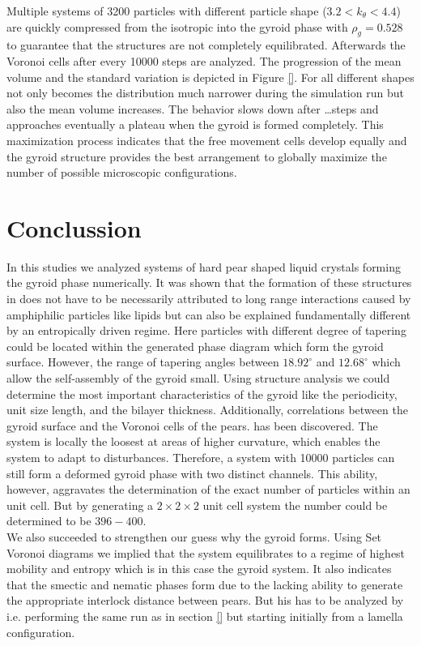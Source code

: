 \documentclass[epj,onecolumn]{webofc}
\begin{document}
Multiple systems of 3200 particles with different particle shape ($3.2<k_{\theta}<4.4$) are quickly compressed from the isotropic into the gyroid phase with $\rho_g=0.528$ to guarantee that the structures are not completely equilibrated. Afterwards the Voronoi cells after every 10000 steps are analyzed. The progression of the mean volume and the standard variation is depicted in Figure \ref{}. For all different shapes not only becomes the distribution much narrower during the simulation run but also the mean volume increases. The behavior slows down after \dots steps and approaches eventually a plateau when the gyroid is formed completely.  This maximization process indicates that the free movement cells develop equally and the gyroid structure provides the best arrangement to globally maximize the number of possible microscopic configurations.

\section{Conclussion}
\label{sec:Conclussion}

In this studies we analyzed systems of hard pear shaped liquid crystals forming the gyroid phase numerically. It was shown that the formation of these structures in does not have to be necessarily attributed to long range interactions caused by amphiphilic particles like lipids but can also be explained fundamentally different by an entropically driven regime. Here particles with different degree of tapering could be located within the generated phase diagram which form the gyroid surface. However, the range of tapering angles between $18.92^{\circ}$ and $12.68^{\circ}$ which allow the self-assembly of the gyroid small. Using structure analysis we could determine the most important characteristics of the gyroid like the periodicity, unit size length, and the bilayer thickness. Additionally, correlations between the gyroid surface and the Voronoi cells of the pears. has been discovered. The system is locally the loosest at areas of higher curvature, which enables the system to adapt to disturbances. Therefore, a system with 10000 particles can still form a deformed gyroid phase with two distinct channels. This ability, however, aggravates the determination of the exact number of particles within an unit cell. But by generating a $2\times2\times2$ unit cell system the number could be determined to be $396-400$.\\

We also succeeded to strengthen our guess why the gyroid forms. Using Set Voronoi diagrams we implied that the system equilibrates to a regime of highest mobility and entropy which is in this case the gyroid system. It also indicates that the smectic and nematic phases form due to the lacking ability to generate the appropriate interlock  distance between pears. But his has to be analyzed by i.e. performing the same run as in section \ref{} but starting initially from a lamella configuration.\\
\end{document}
